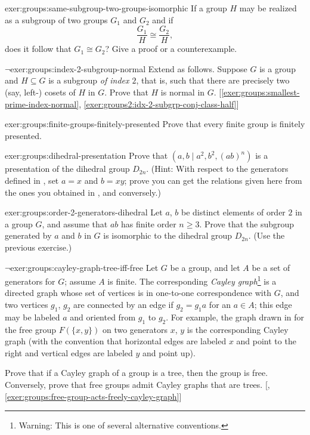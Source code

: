 \begin{exer}{}{exer:groups:same-subgroup-two-groups-isomorphic}
  If a group $H$ may be realized as a subgroup of two groups $G_1$ and
  $G_2$ and if
  \[
    \frac{G_1}{H} \cong \frac{G_2}{H},
  \]
  does it follow that $G_1 \cong G_2$? Give a proof or a
  counterexample.
\end{exer}
\begin{exer}{$\lnot$}{exer:groups:index-2-subgroup-normal}
  Extend  as follows. Suppose $G$
  is a group and $H \subseteq G$ is a subgroup \emph{of index $2$},
  that is, such that there are precisely two (say, left-) cosets of
  $H$ in $G$.  Prove that $H$ is normal in
  $G$. [\ref{exer:groups:smallest-prime-index-normal},
  \ref{exer:groups2:idx-2-subgrp-conj-class-half}]
\end{exer}
\begin{exer}{}{exer:groups:finite-groups-finitely-presented}
  Prove that every finite group is finitely presented.
\end{exer}
\begin{exer}{}{exer:groups:dihedral-presentation}
  Prove that $(a,b \mid a^2, b^2, (ab)^n)$ is a presentation of the
  dihedral group $D_{2n}$. (Hint: With respect to the generators
  defined in , set $a = x$ and
  $b = xy$; prove you can get the relations given here from the ones
  you obtained in , and
  conversely.)
\end{exer}
\begin{exer}{}{exer:groups:order-2-generators-dihedral}
  Let $a$, $b$ be distinct elements of order $2$ in a group $G$, and
  assume that $ab$ has finite order $n \geq 3$. Prove that the
  subgroup generated by $a$ and $b$ in $G$ is isomorphic to the
  dihedral group $D_{2n}$. (Use the previous exercise.)
\end{exer}
\begin{exer}{$\lnot$}{exer:groups:cayley-graph-tree-iff-free}
  Let $G$ be a group, and let $A$ be a set of generators for $G$;
  assume $A$ is finite. The corresponding \emph{Cayley
    graph}\footnote{Warning: This is one of several alternative
    conventions.} is a directed graph whose set of vertices is in
  one-to-one correspondence with $G$, and two vertices $g_1$, $g_2$
  are connected by an edge if $g_2 = g_1a$ for an $a \in A$; this edge
  may be labeled $a$ and oriented from $g_1$ to $g_2$. For example,
  the graph drawn in
   for the
  free group $F(\{x,y\})$ on two generators $x$, $y$ is the
  corresponding Cayley graph (with the convention that horizontal
  edges are labeled $x$ and point to the right and vertical edges are
  labeled $y$ and point up).

  Prove that if a Cayley graph of a group is a tree, then the group is
  free. Conversely, prove that free groups admit Cayley graphs that
  are trees. [,
  \ref{exer:groups:free-group-acts-freely-cayley-graph}]
\end{exer}
